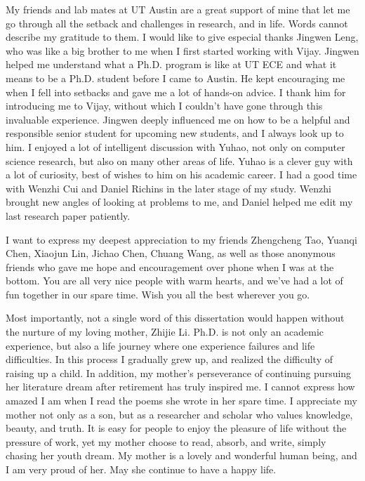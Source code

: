 \begin{acknowledgments}
My friends and lab mates at UT Austin are a great support of mine that let me go through all the setback and challenges in research, and in life. Words cannot describe my gratitude to them. I would like to give especial thanks Jingwen Leng, who was like a big brother to me when I first started working with Vijay. Jingwen helped me understand what a Ph.D. program is like at UT ECE and what it means to be a Ph.D. student before I came to Austin. He kept encouraging me when I fell into setbacks and gave me a lot of hands-on advice. I thank him for introducing me to Vijay, without which I couldn't have gone through this invaluable experience. Jingwen deeply influenced me on how to be a helpful and responsible senior student for upcoming new students, and I always look up to him. I enjoyed a lot of intelligent discussion with Yuhao, not only on computer science research, but also on many other areas of life. Yuhao is a clever guy with a lot of curiosity, best of wishes to him on his academic career. I had a good time with Wenzhi Cui and Daniel Richins in the later stage of my study. Wenzhi brought new angles of looking at problems to me, and Daniel helped me edit my last research paper patiently.

I want to express my deepest appreciation to my friends Zhengcheng Tao, Yuanqi Chen, Xiaojun Lin, Jichao Chen, Chuang Wang, as well as those anonymous friends who gave me hope and encouragement over phone when I was at the bottom. You are all very nice people with warm hearts, and we've had a lot of fun together in our spare time. Wish you all the best wherever you go.

Most importantly, not a single word of this dissertation would happen without the nurture of my loving mother, Zhijie Li. Ph.D. is not only an academic experience, but also a life journey where one experience failures and life difficulties. In this process I gradually grew up, and realized the difficulty of raising up a child. In addition, my mother's perseverance of continuing pursuing her literature dream after retirement has truly inspired me. I cannot express how amazed I am when I read the poems she wrote in her spare time. I appreciate my mother not only as a son, but as a researcher and scholar who values knowledge, beauty, and truth. It is easy for people to enjoy the pleasure of life without the pressure of work, yet my mother choose to read, absorb, and write, simply chasing her youth dream. My mother is a lovely and wonderful human being, and I am very proud of her. May she continue to have a happy life.


\end{acknowledgments}
